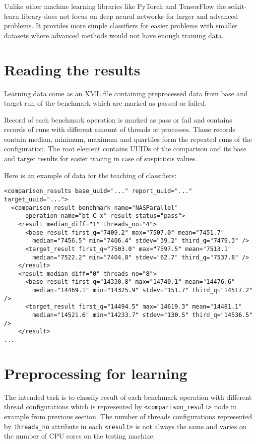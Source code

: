 Unlike other machine learning libraries like PyTorch and TensorFlow the
scikit-learn library does not focus on deep neural networks for larger and
advanced problems. It provides more simple classifiers for easier problems
with smaller datasets where advanced methods would not have enough training
data.

\section{Reading the results}
Learning data come as an XML file containing preprocessed data from
base and target run of the benchmark which are marked as passed or failed.

Record of each benchmark operation is marked as pass or fail and contains
records of runs with different amount of threads or processes. Those records
contain median, minimum, maximum and quartiles form the repeated runs of the
configuration. The root element contains UUIDs of the comparison and its base
and target results for easier tracing in case of suspicious values.

Here is an example of data for the teaching of classifiers:
\begin{verbatim}
<comparison_results base_uuid="..." report_uuid="..." target_uuid="...">
  <comparison_result benchmark_name="NASParallel"
      operation_name="bt_C_x" result_status="pass">
    <result median_diff="1" threads_no="4">
      <base_result first_q="7409.2" max="7507.0" mean="7451.7"
        median="7456.5" min="7406.4" stdev="39.2" third_q="7479.3" />
      <target_result first_q="7503.0" max="7597.5" mean="7513.1"
        median="7522.2" min="7404.8" stdev="62.7" third_q="7537.8" />
    </result>
    <result median_diff="0" threads_no="8">
      <base_result first_q="14330.8" max="14740.1" mean="14476.6"
        median="14469.1" min="14325.9" stdev="151.7" third_q="14517.2" />
      <target_result first_q="14494.5" max="14619.3" mean="14481.1"
        median="14521.6" min="14233.7" stdev="130.5" third_q="14536.5" />
    </result>
...
\end{verbatim}

\section{Preprocessing for learning}
The intended task is to classify result of each benchmark operation with
different thread configurations which is represented by
\texttt{<comparison\_result>} node in example from previous section. The number
of threads configurations represented by \texttt{threads\_no} attribute in each
\texttt{<result>} is not always the same and varies on the number of CPU cores
on the testing machine.

